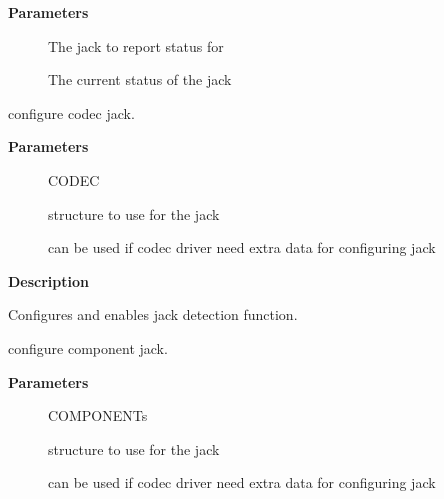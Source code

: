 \documentclass[a4paper,8pt,english]{sphinxmanual}
\begin{document}
\textbf{Parameters}
\begin{description}
\item[{}] \leavevmode
The jack to report status for

\item[{}] \leavevmode
The current status of the jack

\end{description}

\begin{fulllineitems}
\label{sound/kernel-api/alsa-driver-api:c.snd_soc_codec_set_jack}
configure codec jack.

\end{fulllineitems}


\textbf{Parameters}
\begin{description}
\item[{}] \leavevmode
CODEC

\item[{}] \leavevmode
structure to use for the jack

\item[{}] \leavevmode
can be used if codec driver need extra data for configuring jack

\end{description}

\textbf{Description}

Configures and enables jack detection function.

\begin{fulllineitems}
\label{sound/kernel-api/alsa-driver-api:c.snd_soc_component_set_jack}
configure component jack.

\end{fulllineitems}


\textbf{Parameters}
\begin{description}
\item[{}] \leavevmode
COMPONENTs

\item[{}] \leavevmode
structure to use for the jack

\item[{}] \leavevmode
can be used if codec driver need extra data for configuring jack

\end{description}
\end{document}
